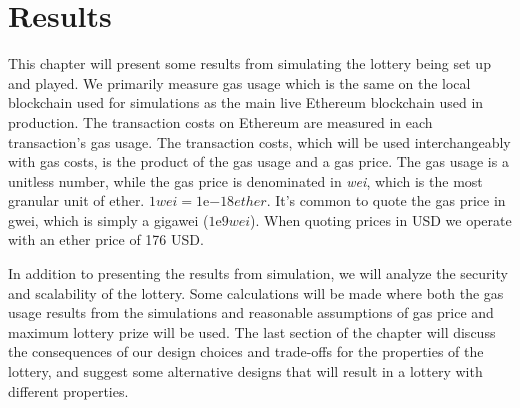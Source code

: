 \chapter{Results}
\label{chap:results}

This chapter will present some results from simulating the lottery being set up and played. We primarily measure gas usage which is the same on the local blockchain used for simulations as the main live Ethereum blockchain used in production. The transaction costs on Ethereum are measured in each transaction's gas usage. The transaction costs, which will be used interchangeably with gas costs, is the product of the gas usage and a gas price. The gas usage is a unitless number, while the gas price is denominated in \emph{wei}, which is the most granular unit of ether. $1 wei=1 \mathrm{e}{-18} ether$. It's common to quote the gas price in gwei, which is simply a gigawei ($1\mathrm{e}{9} wei$). When quoting prices in USD we operate with an ether price of 176 USD. 

In addition to presenting the results from simulation, we will analyze the security and scalability of the lottery. Some calculations will be made where both the gas usage results from the simulations and reasonable assumptions of gas price and maximum lottery prize will be used.
The last section of the chapter will discuss the consequences of our design choices and trade-offs for the properties of the lottery, and suggest some alternative designs that will result in a lottery with different properties.







